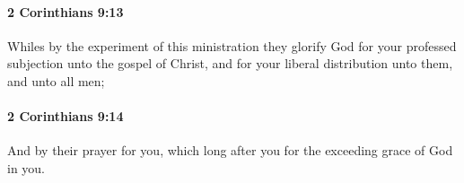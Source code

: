 		\paragraph{2 Corinthians 9:13} %
			\label{2CORINTHIANS-9-13}

			Whiles by the experiment of this ministration they glorify God for your professed subjection unto the gospel of Christ, and for your liberal distribution unto them, and unto all men;

			\begin{framed}
			\scriptsize
				\begin{compactdesc}
					\item[SBLG] 
				\end{compactdesc}
			\end{framed}

		\paragraph{2 Corinthians 9:14} %
			\label{2CORINTHIANS-9-14}

			And by their prayer for you, which long after you for the exceeding grace of God in you.

